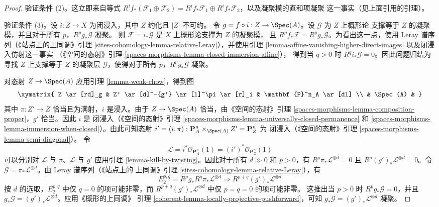 \begin{proof}
\medskip\noindent
验证条件 (2)。这立即来自等式
$R^if_*(\mathcal{F}_1 \oplus \mathcal{F}_2) =
R^if_*\mathcal{F}_1 \oplus R^if_*\mathcal{F}_2$，以及凝聚模的直和项凝聚
这一事实（见上面引用的引理）。

\medskip\noindent
验证条件 (3)。设 $i : Z \to X$ 为闭浸入，其中 $Z$ 约化且 $|Z|$ 不可约。
令 $g = f \circ i : Z \to \Spec(A)$。设 $\mathcal{G}$ 为 $Z$ 上概形论
支撑等于 $Z$ 的凝聚模，并且对于所有 $p$，$R^pg_*\mathcal{G}$ 凝聚。
则 $\mathcal{F} = i_*\mathcal{G}$ 是 $X$ 上概形论支撑为 $Z$ 的凝聚模，
且 $R^pf_*\mathcal{F} = R^pg_*\mathcal{G}$。为看出这一点，使用 Leray
谱序列（《站点上的上同调》引理
\ref{sites-cohomology-lemma-relative-Leray}），并使用引理
\ref{lemma-affine-vanishing-higher-direct-images} 以及闭浸入仿射这一事实
（《空间的态射》引理 \ref{spaces-morphisms-lemma-closed-immersion-affine}），
得到当 $q > 0$ 时 $R^qi_*\mathcal{G} = 0$。因此问题归结为寻找
$Z$ 上支撑等于 $Z$ 的凝聚层
$\mathcal{G}$，使得对于所有 $p$，$R^pg_*\mathcal{G}$ 凝聚。

\medskip\noindent
对态射 $Z \to \Spec(A)$ 应用引理 \ref{lemma-weak-chow}，得到图
$$
\xymatrix{
Z \ar[rd]_g & Z' \ar[d]^-{g'} \ar[l]^\pi \ar[r]_i & \mathbf{P}^n_A \ar[dl] \\
& \Spec(A) &
}
$$
其中 $\pi : Z' \to Z$ 恰当且为满射，$i$ 是浸入。由于
$Z \to \Spec(A)$ 恰当，由《空间的态射》引理
\ref{spaces-morphisms-lemma-composition-proper}，$g'$ 恰当。因此 $i$ 是
闭浸入（《空间的态射》引理
\ref{spaces-morphisms-lemma-universally-closed-permanence} 和
\ref{spaces-morphisms-lemma-immersion-when-closed}）。由此可知态射
$i' = (i, \pi) : \mathbf{P}^n_A \times_{\Spec(A)} Z' = \mathbf{P}^n_Z$ 为
闭浸入（《空间的态射》引理
\ref{spaces-morphisms-lemma-semi-diagonal}）。%
令
$$
\mathcal{L} =
i^*\mathcal{O}_{\mathbf{P}^n_A}(1) =
(i')^*\mathcal{O}_{\mathbf{P}^n_Z}(1)
$$
可以分别对 $\mathcal{L}$ 与 $\pi$、$\mathcal{L}$ 与 $g'$ 应用引理
\ref{lemma-kill-by-twisting}。因此对于所有 $d \gg 0$ 和 $p > 0$，有
$R^p\pi_*\mathcal{L}^{\otimes d} = 0$ 且
$R^p(g')_*\mathcal{L}^{\otimes d} = 0$。令
$\mathcal{G} = \pi_*\mathcal{L}^{\otimes d}$。由 Leray 谱序列（《站点上的
上同调》引理 \ref{sites-cohomology-lemma-relative-Leray}），有
$$
E_2^{p, q} = R^pg_* R^q\pi_*\mathcal{L}^{\otimes d}
\Rightarrow
R^{p + q}(g')_*\mathcal{L}^{\otimes d}
$$
按 $d$ 的选取，$E_2^{p, q}$ 中仅 $q = 0$ 的项可能非零，而
$R^{p + q}(g')_*\mathcal{L}^{\otimes d}$ 中仅 $p = q = 0$ 的项可能非零。
这推出当 $p > 0$ 时 $R^pg_*\mathcal{G} = 0$，并且
$g_*\mathcal{G} = (g')_*\mathcal{L}^{\otimes d}$。应用《概形的上同调》
引理 \ref{coherent-lemma-locally-projective-pushforward}，可知
$g_*\mathcal{G} = (g')_*\mathcal{L}^{\otimes d}$ 凝聚。


\end{proof}
